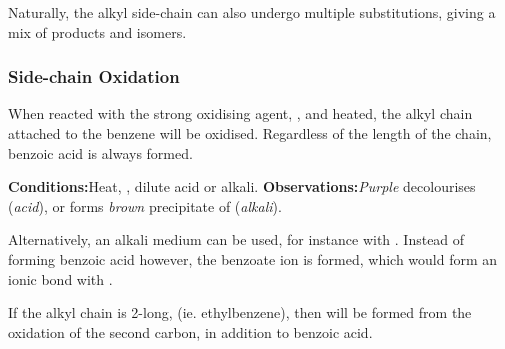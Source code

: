 				Naturally, the alkyl side-chain can also undergo multiple substitutions, giving a mix of products and isomers.



			\subsubsection{Side-chain Oxidation}

				When reacted with the strong oxidising agent, , and heated, the alkyl chain attached to the benzene will be oxidised.
				Regardless of the length of the chain, benzoic acid is always formed.

				\vspace{1.5em}

				\vbox{\textbf{Conditions:}\tabto{35mm}Heat, , dilute acid or alkali.}\vspace{0.5em}
				\vbox{\textbf{Observations:}\tabto{35mm}\textit{\color{Plum}Purple}  decolourises (\textit{acid}), or
											\tabto{35mm}forms \textit{\color{Brown}brown} precipitate of  (\textit{alkali}).}



				\pagebreak
				Alternatively, an alkali medium can be used, for instance with . Instead of forming benzoic acid however, the
				benzoate ion is formed, which would form an ionic bond with .





				If the alkyl chain is 2-long, (ie. ethylbenzene), then  will be formed from the oxidation of the second carbon,
				in addition to benzoic acid.


